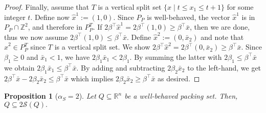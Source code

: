 \documentclass[11pt]{article}
\newcommand{\Z}{\mathbb{Z}}
\newcommand{\R}{\mathbb{R}}
\newcommand{\seq}{\subseteq}
\renewcommand{\S}{\mathcal{S}}
\newcommand{\bpar}{\beta}
\newtheorem{proposition}{Proposition}
\newcommand{\cred}{\color{black}}
\begin{document}
\begin{proof}
Finally, assume that $T$ is a vertical split set {\cred $\{x \mid t \le x_1 \le t+1\}$} for some integer $t$.
Define now $\hat x^1 := (1,0)$.
Since $P_P$ is well-behaved, {\cred the} vector $\hat x^1$ is in $P_P \cap \Z^2$, and therefore in $P_P^T$.
If $2\bpar^\top \hat x^1 = 2 \bpar^\top (1,0) \ge \bpar^\top \bar x$, then we are done, thus we now assume $2 \bpar^\top (1,0) \le \bpar^\top \bar x$.
Define $\hat x^2 := (0, \bar x_2)$ and note that $\hat x^2 \in P_P^T$ since $T$ is a vertical split set.
We show 
$2\bpar^\top\hat x^2 = 2\bpar^\top (0, \bar x_2) \ge \bpar^\top \bar x$.
Since $\bpar_1 \ge 0$ and $\bar x_1 < 1$, we have $2 \bpar_1 \bar x_1 < 2 \bpar_1$.
By summing the latter with $2 \bpar_1 \le \bpar^\top \bar x$ we obtain $2 \bpar_1 \bar x_1 \le \bpar^\top \bar x$.
By adding and subtracting $2\bpar_2 \bar x_2$ to the left-hand, we get $2 \bpar^\top \bar x - 2\bpar_2 \bar x_2 \le \bpar^\top \bar x$ which implies $2 \bpar_2 \bar x_2 \ge \bpar^\top \bar x$ as desired.
\end{proof}
\begin{proposition}[$\alpha_S = 2$]
\label{prop:packing2approx}
Let  $Q \seq \R^n$ be a well-behaved packing set. Then, 
$Q \seq 2 \S(Q).$
\end{proposition}
\end{document}
